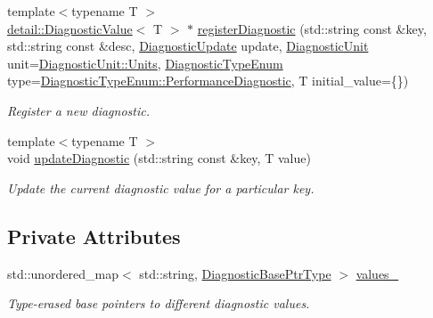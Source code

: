 \begin{DoxyCompactItemize}
{\footnotesize template$<$typename T $>$ }\\\hyperlink{structvt_1_1runtime_1_1component_1_1detail_1_1_diagnostic_value}{detail\+::\+Diagnostic\+Value}$<$ T $>$ $\ast$ \hyperlink{structvt_1_1runtime_1_1component_1_1_diagnostic_ab71509224f5716107ef5c781ba5ff487}{register\+Diagnostic} (std\+::string const \&key, std\+::string const \&desc, \hyperlink{namespacevt_1_1runtime_1_1component_a896637e6e183a909a17bfd8d3943c206}{Diagnostic\+Update} update, \hyperlink{namespacevt_1_1runtime_1_1component_a99ec18b08862c712176126bb7d0e307a}{Diagnostic\+Unit} unit=\hyperlink{namespacevt_1_1runtime_1_1component_a99ec18b08862c712176126bb7d0e307aae5771a362d88a71a657bfcd21ca54b3f}{Diagnostic\+Unit\+::\+Units}, \hyperlink{namespacevt_1_1runtime_1_1component_af0bb99d9a054682217874bdc735ecac0}{Diagnostic\+Type\+Enum} type=\hyperlink{namespacevt_1_1runtime_1_1component_af0bb99d9a054682217874bdc735ecac0ab95e46074ff803c7a6f7107c2c1d382c}{Diagnostic\+Type\+Enum\+::\+Performance\+Diagnostic}, T initial\+\_\+value=\{\})
\begin{DoxyCompactList}\small\item\em Register a new diagnostic. \end{DoxyCompactList}\item 
{\footnotesize template$<$typename T $>$ }\\void \hyperlink{structvt_1_1runtime_1_1component_1_1_diagnostic_a97b0e8ff394c8aa04035ff15165eb087}{update\+Diagnostic} (std\+::string const \&key, T value)
\begin{DoxyCompactList}\small\item\em Update the current diagnostic value for a particular key. \end{DoxyCompactList}\end{DoxyCompactItemize}
\subsection*{Private Attributes}
\begin{DoxyCompactItemize}
\item 
std\+::unordered\+\_\+map$<$ std\+::string, \hyperlink{structvt_1_1runtime_1_1component_1_1_diagnostic_ad95ea698535524d0f82c5da9beaaaf37}{Diagnostic\+Base\+Ptr\+Type} $>$ \hyperlink{structvt_1_1runtime_1_1component_1_1_diagnostic_ab4cb6c67b01b76f91cc806a79169da69}{values\+\_\+}
\begin{DoxyCompactList}\small\item\em Type-\/erased base pointers to different diagnostic values. \end{DoxyCompactList}\end{DoxyCompactItemize}
